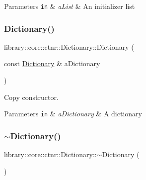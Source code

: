 \begin{DoxyParams}[1]{Parameters}
\mbox{\tt in}  & {\em a\+List} & An initializer list \\
\hline
\end{DoxyParams}
\mbox{\label{classlibrary_1_1core_1_1ctnr_1_1Dictionary_a17e09d0a01799ed41cb6dfe9cf7dd52c}} 
\subsubsection{\texorpdfstring{Dictionary()}{Dictionary()}\hspace{0.1cm}{\footnotesize\ttfamily [2/2]}}
{\footnotesize\ttfamily library\+::core\+::ctnr\+::\+Dictionary\+::\+Dictionary (\begin{DoxyParamCaption}\item[{const \hyperlink{classlibrary_1_1core_1_1ctnr_1_1Dictionary}{Dictionary} \&}]{a\+Dictionary }\end{DoxyParamCaption})}



Copy constructor. 


\begin{DoxyParams}[1]{Parameters}
\mbox{\tt in}  & {\em a\+Dictionary} & A dictionary \\
\hline
\end{DoxyParams}
\mbox{\label{classlibrary_1_1core_1_1ctnr_1_1Dictionary_a4b06c3b334776cb177aa3423bce0afaa}} 
\subsubsection{\texorpdfstring{$\sim$\+Dictionary()}{~Dictionary()}}
{\footnotesize\ttfamily library\+::core\+::ctnr\+::\+Dictionary\+::$\sim$\+Dictionary (\begin{DoxyParamCaption}{ }\end{DoxyParamCaption})}



